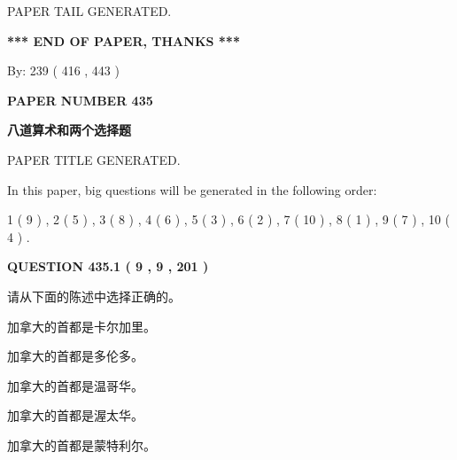 \documentclass{ctexart}
\begin{document}
   
   
\vspace{2.0in} PAPER TAIL GENERATED.
   
   
   
   
\vspace{1.0in} 
{\textbf{\large{ *** END OF PAPER, THANKS *** }}} 
   
   
\hspace{1.0in} By: 
 239 ( 416 ,  443 )
   
   
   
   
\newpage 
\setcounter{page}{ 
   435001 } 
   
   
   
   
 {\textbf{ \Large{ PAPER NUMBER  435  }}}
   
   
\vspace{0.2in}
   
   
   
   
   
   
   
   
 \vspace{0.2in}
{\LARGE {\textbf{ 八道算术和两个选择题}}}
   
   
 PAPER TITLE GENERATED.
   
   
   
\vspace{0.2in}
   
In this paper, big questions will be generated in the following order: 
   
   
   1 ( 9 )
 ,
   2 ( 5 )
 ,
   3 ( 8 )
 ,
   4 ( 6 )
 ,
   5 ( 3 )
 ,
   6 ( 2 )
 ,
   7 ( 10 )
 ,
   8 ( 1 )
 ,
   9 ( 7 )
 ,
   10 ( 4 )
 .
  
\vspace{0.2in}
  
{\textbf{\Large{QUESTION
435.1 
 ( 9 , 9 , 201 )
}}}
  
  
请从下面的陈述中选择正确的。
 
 
加拿大的首都是卡尔加里。
 
 
加拿大的首都是多伦多。
 
 
加拿大的首都是温哥华。
 
 
加拿大的首都是渥太华。
 
 
加拿大的首都是蒙特利尔。
 
\end{document}
